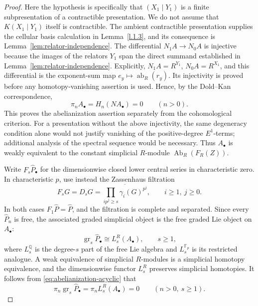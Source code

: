 \documentclass[11pt,a4paper]{article}
\begin{document}
\begin{proof}
Here the hypothesis is specifically that $(X_1\mid Y_1)$ is a finite
subpresentation of a contractible presentation.  We do not assume that
$K(X_1\mid Y_1)$ itself is contractible.  The ambient contractible
presentation supplies the cellular basis calculation in
Lemma~\ref{l.1.3}, and its consequence is
Lemma~\ref{lem:relator-independence}.
The differential $N_1A\to N_0A$ is injective because the images of the
relators $Y_1$ span the direct summand established in
Lemma~\ref{lem:relator-independence}.  Explicitly, $N_1A=R^{Y_1}$,
$N_0A=R^{X_1}$, and this differential is the exponent-sum map
$e_y\mapsto\operatorname{ab}_R(r_y)$.  Its injectivity is proved
before any homotopy-vanishing assertion is used.  Hence, by the Dold--Kan correspondence,
\begin{equation}\label{eq:abelianization-acyclic}
 \pi_nA_\bullet=H_n(NA_\bullet)=0\qquad(n>0).
\end{equation}
This proves the abelianization assertion separately from the
cohomological criterion.  For a presentation without the above
injectivity, the same degeneracy condition alone would not justify
vanishing of the positive-degree $E^1$-terms; additional analysis of
the spectral sequence would be necessary.
Thus $A_\bullet$ is weakly equivalent to the constant simplicial
$R$-module $\operatorname{Ab}_R(F_R(Z))$.

Write $F_s\widehat P_\bullet$ for the dimensionwise closed lower central
series in characteristic zero.  In characteristic $p$, use instead the
Zassenhaus filtration
\[
 F_sG=D_sG=\overline{\prod_{ip^j\geq s}\gamma_i(G)^{p^j}},
 \qquad i\geq1,\ j\geq0.
\]
In both cases $F_1\widehat P=\widehat P$, and the filtration is complete
and separated.  Since every $\widehat P_n$ is free, the associated graded
simplicial object is the free graded Lie object on $A_\bullet$:
\[
 \operatorname{gr}_s\widehat P_\bullet
 \cong L_s^R(A_\bullet),\qquad s\geq1,
\]
where $L_s^{\mathbb Q}$ is the degree-$s$ part of the free Lie algebra and
$L_s^{\mathbb F_p}$ is its restricted analogue.  A weak equivalence of
simplicial $R$-modules is a simplicial homotopy equivalence, and the
dimensionwise functor $L_s^R$ preserves simplicial homotopies.  It follows
from \eqref{eq:abelianization-acyclic} that
\[
 \pi_n\operatorname{gr}_s\widehat P_\bullet
 =\pi_nL_s^R(A_\bullet)=0
 \qquad(n>0,\ s\geq1).
\]


\end{proof}
\end{document}
